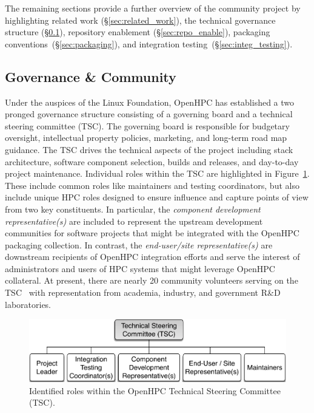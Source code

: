 \documentclass{sig-alternate-05-2015}
\begin{document}
The remaining sections provide a further overview of the community project
by highlighting related work (\S\ref{sec:related_work}), the technical governance
structure (\S\ref{sec:governance}), repository enablement (\S\ref{sec:repo_enable}), packaging
conventions~(\S\ref{sec:packaging}), and integration testing~(\S\ref{sec:integ_testing}).




\subsection{Governance \& Community} \label{sec:governance}
Under the auspices of the Linux Foundation, OpenHPC has established a two
pronged governance structure consisting of a governing board and a technical
steering committee (TSC). The governing board is responsible for budgetary
oversight, intellectual property policies, marketing, and long-term road map
guidance. The TSC drives the technical aspects of the project including stack
architecture, software component selection, builds and releases, and day-to-day
project maintenance. Individual roles within the TSC are highlighted in
Figure~\ref{fig:tsc_governance}.  These include common roles like maintainers
and testing coordinators, but also include unique HPC roles designed to ensure
influence and capture points of view from two key constituents. In particular,
the {\em component development representative(s)} are included to represent the
upstream development communities for software projects that might be integrated
with the OpenHPC packaging collection. In contrast, the {\em end-user/site
  representative(s)} are downstream recipients of OpenHPC integration efforts
and serve the interest of administrators and users of HPC systems that might leverage
OpenHPC collateral.  At present, there are nearly 20 community volunteers
serving on the TSC~\cite{TSC_url} with representation from academia, industry,
and government R\&D laboratories.


\begin{figure}
  \includegraphics[width=1.0\linewidth]{figures/governance}
  \caption{Identified roles within the OpenHPC Technical Steering Committee (TSC).}
  \label{fig:tsc_governance}
\end{figure}
\end{document}
